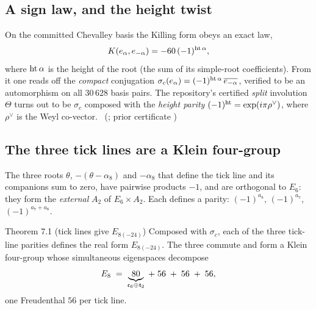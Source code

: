 \subsection{A sign law, and the height twist}

On the committed Chevalley basis the Killing form obeys an exact law,
\[
K(e_\alpha,e_{-\alpha})=-60\,(-1)^{\operatorname{ht}\alpha},
\]
where $\operatorname{ht}\alpha$ is the height of the root (the sum of its simple-root coefficients). From
it one reads off the \emph{compact} conjugation $\sigma_c(e_\alpha)=(-1)^{\operatorname{ht}\alpha}\,
\overline{e_{-\alpha}}$, verified to be an automorphism on all $30\,628$ basis pairs. The
repository's certified \emph{split} involution $\Theta$ turns out to be $\sigma_c$
composed with the \emph{height parity} $(-1)^{\operatorname{ht}}=\exp(i\pi\rho^\vee)$, where $\rho^\vee$
is the Weyl co-vector. \tierC\ (;
prior certificate )

\subsection{The three tick lines are a Klein four-group}

The three roots $\theta$, $-(\theta-\alpha_8)$ and $-\alpha_8$ that define the tick line
and its companions sum to zero, have pairwise products $-1$, and are orthogonal to $E_6$:
they form the \emph{external} $A_2$ of $E_6\times A_2$. Each defines a parity: $(-1)^{a_8}$,
$(-1)^{a_7}$, $(-1)^{a_7+a_8}$.

\begin{result}{Theorem 7.1 (tick lines give $E_{8(-24)}$) \hfill \tierC}
Composed with $\sigma_c$, each of the three tick-line parities defines the real form
$E_{8(-24)}$. The three commute and form a Klein four-group whose simultaneous eigenspaces
decompose
\[
E_8\;=\;\underbrace{80}_{\mathfrak{e}_6\oplus\mathfrak t_2}\;+\;56\;+\;56\;+\;56,
\]
one Freudenthal $56$ per tick line.
\end{result}

